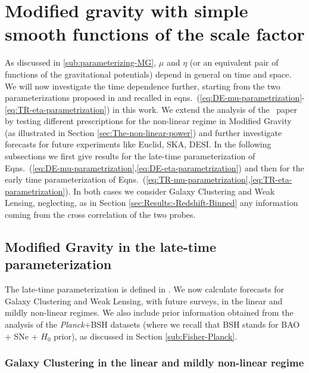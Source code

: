 \section{Modified gravity with simple smooth functions of the scale factor}

As discussed in \cref{sub:parameterizing-MG}, $\mu$ and $\eta$ (or an equivalent pair of functions of the gravitational potentials) depend in general on time and space. We will now investigate the time dependence further, starting from the two parameterizations proposed in \cite{planck_collaboration_planck_2016-7} and recalled in eqns.\ (\ref{eq:DE-mu-parametrization}-\ref{eq:TR-eta-parametrization}) in this work. We extend the analysis of the \planck\ paper \cite{planck_collaboration_planck_2016-7} by testing different prescriptions for the non-linear regime in Modified Gravity (as illustrated in Section \ref{sec:The-non-linear-power}) and further investigate forecasts for future experiments like Euclid, SKA, DESI. In the following subsections we first give results for the late-time parameterization of Eqns.\ (\ref{eq:DE-mu-parametrization},\ref{eq:DE-eta-parametrization}) and then for the early time parameterization of Eqns.\ (\ref{eq:TR-mu-parametrization},\ref{eq:TR-eta-parametrization}). In both cases we consider Galaxy Clustering and Weak Lensing, neglecting, as in Section \ref{sec:Results:-Redshift-Binned} any information coming from the cross correlation of the two probes.

\subsection{\label{sub:MG-DE}Modified Gravity in the late-time parameterization}

The late-time parameterization is defined in  . We now calculate forecasts for Galaxy Clustering and Weak Lensing, with future surveys, in the linear and mildly non-linear regimes.
We also include prior information obtained from
the analysis of the {\it Planck}+BSH datasets (where we recall that BSH stands for BAO + SNe + $H_0$ prior),
as discussed in Section \ref{sub:Fisher-Planck}.

\subsubsection{Galaxy Clustering in the linear and mildly non-linear regime}

